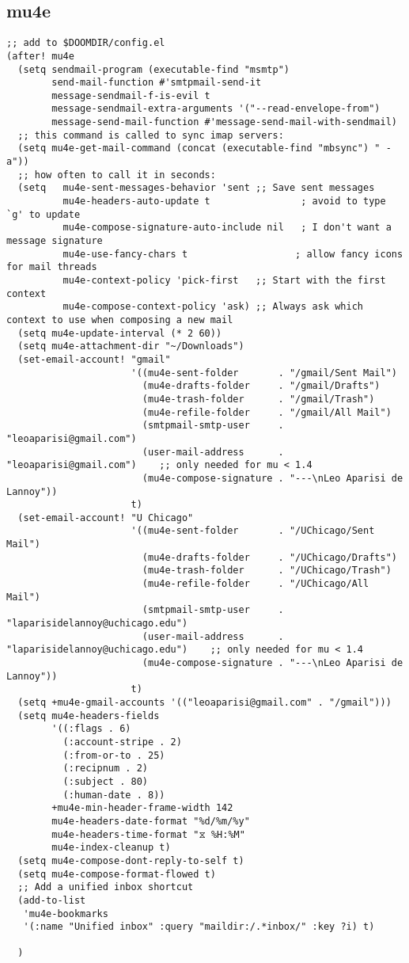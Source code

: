 \documentclass[c]{article}
\theoremstyle{plain}%
\theoremstyle{definition}
\theoremstyle{remark}
\begin{document}
\subsection{mu4e}
\label{sec:org290e3b9}
\begin{verbatim}
;; add to $DOOMDIR/config.el
(after! mu4e
  (setq sendmail-program (executable-find "msmtp")
        send-mail-function #'smtpmail-send-it
        message-sendmail-f-is-evil t
        message-sendmail-extra-arguments '("--read-envelope-from")
        message-send-mail-function #'message-send-mail-with-sendmail)
  ;; this command is called to sync imap servers:
  (setq mu4e-get-mail-command (concat (executable-find "mbsync") " -a"))
  ;; how often to call it in seconds:
  (setq   mu4e-sent-messages-behavior 'sent ;; Save sent messages
          mu4e-headers-auto-update t                ; avoid to type `g' to update
          mu4e-compose-signature-auto-include nil   ; I don't want a message signature
          mu4e-use-fancy-chars t                   ; allow fancy icons for mail threads
          mu4e-context-policy 'pick-first   ;; Start with the first context
          mu4e-compose-context-policy 'ask) ;; Always ask which context to use when composing a new mail
  (setq mu4e-update-interval (* 2 60))
  (setq mu4e-attachment-dir "~/Downloads")
  (set-email-account! "gmail"
                      '((mu4e-sent-folder       . "/gmail/Sent Mail")
                        (mu4e-drafts-folder     . "/gmail/Drafts")
                        (mu4e-trash-folder      . "/gmail/Trash")
                        (mu4e-refile-folder     . "/gmail/All Mail")
                        (smtpmail-smtp-user     . "leoaparisi@gmail.com")
                        (user-mail-address      . "leoaparisi@gmail.com")    ;; only needed for mu < 1.4
                        (mu4e-compose-signature . "---\nLeo Aparisi de Lannoy"))
                      t)
  (set-email-account! "U Chicago"
                      '((mu4e-sent-folder       . "/UChicago/Sent Mail")
                        (mu4e-drafts-folder     . "/UChicago/Drafts")
                        (mu4e-trash-folder      . "/UChicago/Trash")
                        (mu4e-refile-folder     . "/UChicago/All Mail")
                        (smtpmail-smtp-user     . "laparisidelannoy@uchicago.edu")
                        (user-mail-address      . "laparisidelannoy@uchicago.edu")    ;; only needed for mu < 1.4
                        (mu4e-compose-signature . "---\nLeo Aparisi de Lannoy"))
                      t)
  (setq +mu4e-gmail-accounts '(("leoaparisi@gmail.com" . "/gmail")))
  (setq mu4e-headers-fields
        '((:flags . 6)
          (:account-stripe . 2)
          (:from-or-to . 25)
          (:recipnum . 2)
          (:subject . 80)
          (:human-date . 8))
        +mu4e-min-header-frame-width 142
        mu4e-headers-date-format "%d/%m/%y"
        mu4e-headers-time-format "⧖ %H:%M"
        mu4e-index-cleanup t)
  (setq mu4e-compose-dont-reply-to-self t)
  (setq mu4e-compose-format-flowed t)
  ;; Add a unified inbox shortcut
  (add-to-list
   'mu4e-bookmarks
   '(:name "Unified inbox" :query "maildir:/.*inbox/" :key ?i) t)

  )
\end{verbatim}
\end{document}
